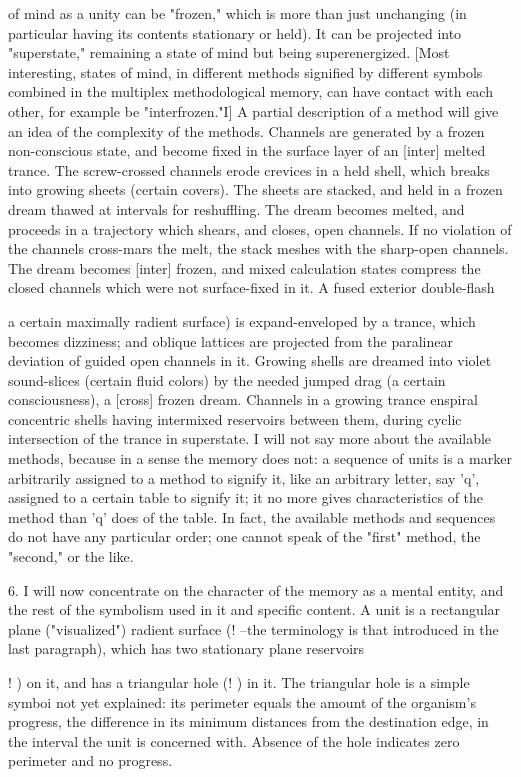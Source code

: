 \documentclass[10pt,twoside]{memoir}
\begin{document}
\begin{enumerate}
{\begin{enumerate}
\begin{sysrules}
\begin{sysrules}
\begin{sysrules}
\begin{sysrules}
{\begin{enumerate}
of mind as a unity can be "frozen," which is more than just unchanging (in 
particular having its contents stationary or held). It can be projected into 
"superstate," remaining a state of mind but being superenergized. [Most 
interesting, states of mind, in different methods signified by different 
symbols combined in the multiplex methodological memory, can have 
contact with each other, for example be "interfrozen."I] A partial description 
of a method will give an idea of the complexity of the methods. Channels are 
generated by a frozen non-conscious state, and become fixed in the surface 
layer of an [inter] melted trance. The screw-crossed channels erode crevices 
in a held shell, which breaks into growing sheets (certain covers). The sheets 
are stacked, and held in a frozen dream thawed at intervals for reshuffling. 
The dream becomes melted, and proceeds in a trajectory which shears, and 
closes, open channels. If no violation of the channels cross-mars the melt, the 
stack meshes with the sharp-open channels. The dream becomes [inter] 
frozen, and mixed calculation states compress the closed channels which 
were not surface-fixed in it. A fused exterior double-flash {a certain 
maximally radient surface) is expand-enveloped by a trance, which becomes 
dizziness; and oblique lattices are projected from the paralinear deviation of 
guided open channels in it. Growing shells are dreamed into violet 
sound-slices (certain fluid colors) by the needed jumped drag (a certain 
consciousness), a [cross] frozen dream. Channels in a growing trance enspiral 
concentric shells having intermixed reservoirs between them, during cyclic 
intersection of the trance in superstate. I will not say more about the 
available methods, because in a sense the memory does not: a sequence of 
units is a marker arbitrarily assigned to a method to signify it, like an 
arbitrary letter, say 'q', assigned to a certain table to signify it; it no more 
gives characteristics of the method than 'q' does of the table. In fact, the 
available methods and sequences do not have any particular order; one 
cannot speak of the "first" method, the "second," or the like. 


6. I will now concentrate on the character of the memory as a mental 
entity, and the rest of the symbolism used in it and specific content. A unit 
is a rectangular plane ("visualized") radient surface (! --the terminology is 
that introduced in the last paragraph), which has two stationary plane 
reservoirs {! ) on it, and has a triangular hole (! ) in it. The triangular hole is 
a simple symboi not yet explained: its perimeter equals the amount of the 
organism's progress, the difference in its minimum distances from the 
destination edge, in the interval the unit is concerned with. Absence of the 
hole indicates zero perimeter and no progress. 

}}
\end{enumerate}}
\end{sysrules}
\end{sysrules}
\end{sysrules}
\end{sysrules}
\end{enumerate}}
\end{enumerate}
\end{document}
